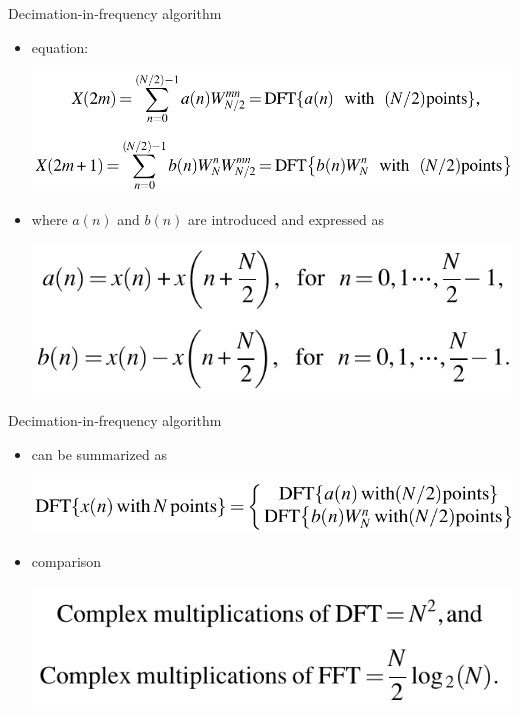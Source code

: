 \documentclass[pdflatex,compress,mathserif]{beamer}
\begin{document}
\begin{frame}{Decimation-in-frequency algorithm}
	\begin{itemize}
		\item equation:
		\begin{center}
			\includegraphics[width=\linewidth]{img/img12}
		\end{center}
		\item where $a(n)$ and $b(n)$ are introduced and expressed as
		\begin{center}
			\includegraphics[width=0.7\linewidth]{img/img13}
		\end{center}
	\end{itemize}
\end{frame}

\begin{frame}{Decimation-in-frequency algorithm}
	\begin{itemize}
		\item can be summarized as
		\begin{center}
			\includegraphics[width=\linewidth]{img/img14}
		\end{center}
		\item comparison
		\begin{center}
			\includegraphics[width=0.7\linewidth]{img/img14a}
		\end{center}
	\end{itemize}
\end{frame}
\end{document}
